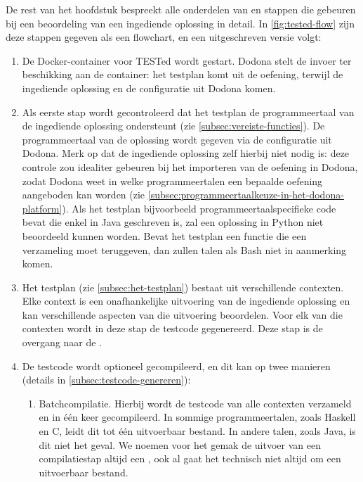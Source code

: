 De rest van het hoofdstuk bespreekt alle onderdelen van en stappen die gebeuren bij een beoordeling van een ingediende oplossing in detail.
In \cref{fig:tested-flow} zijn deze stappen gegeven als een flowchart, en een uitgeschreven versie volgt:

\begin{enumerate}
    \item De Docker-container voor TESTed wordt gestart.
    Dodona stelt de invoer ter beschikking aan de container: het testplan komt uit de oefening, terwijl de ingediende oplossing en de configuratie uit Dodona komen.
    \item Als eerste stap wordt gecontroleerd dat het testplan de programmeertaal van de ingediende oplossing ondersteunt (zie \cref{subsec:vereiste-functies}).
    De programmeertaal van de oplossing wordt gegeven via de configuratie uit Dodona.
    Merk op dat de ingediende oplossing zelf hierbij niet nodig is: deze controle zou idealiter gebeuren bij het importeren van de oefening in Dodona, zodat Dodona weet in welke programmeertalen een bepaalde oefening aangeboden kan worden (zie \cref{subsec:programmeertaalkeuze-in-het-dodona-platform}).
    Als het testplan bijvoorbeeld programmeertaalspecifieke code bevat die enkel in Java geschreven is, zal een oplossing in Python niet beoordeeld kunnen worden.
    Bevat het testplan een functie die een verzameling moet teruggeven, dan zullen talen als Bash niet in aanmerking komen.
    \item Het testplan (zie \cref{subsec:het-testplan}) bestaat uit verschillende contexten.
    Elke context is een onafhankelijke uitvoering van de ingediende oplossing en kan verschillende aspecten van die uitvoering beoordelen.
    Voor elk van die contexten wordt in deze stap de testcode gegenereerd.
    Deze stap is de overgang naar de .
    \item De testcode wordt optioneel gecompileerd, en dit kan op twee manieren (details in \cref{subsec:testcode-genereren}):
    \begin{enumerate}
        \item Batchcompilatie.
        Hierbij wordt de testcode van alle contexten verzameld en in één keer gecompileerd.
        In sommige programmeertalen, zoals Haskell en C, leidt dit tot één uitvoerbaar bestand.
        In andere talen, zoals Java, is dit niet het geval.
        We noemen voor het gemak de uitvoer van een compilatiestap altijd een , ook al gaat het technisch niet altijd om een uitvoerbaar bestand.

\end{enumerate}
\end{enumerate}
